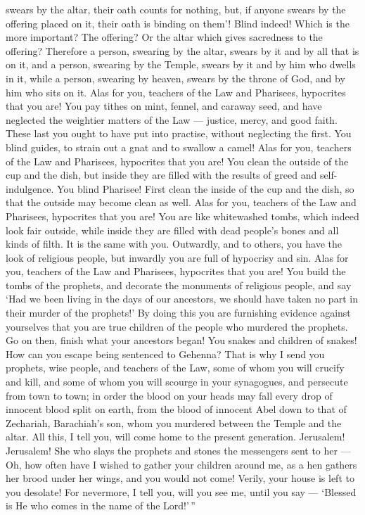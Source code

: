 swears by the altar, their oath counts for nothing, but, if anyone
swears by the offering placed on it, their oath is binding on them'!
 Blind indeed! Which is the more important? The offering?
Or the altar which gives sacredness to the offering? 
Therefore a person, swearing by the altar, swears by it and by all that
is on it,  and a person, swearing by the Temple, swears by
it and by him who dwells in it,  while a person, swearing
by heaven, swears by the throne of God, and by him who sits on it.
 Alas for you, teachers of the Law and Pharisees,
hypocrites that you are! You pay tithes on mint, fennel, and caraway
seed, and have neglected the weightier matters of the Law --- justice,
mercy, and good faith. These last you ought to have put into practise,
without neglecting the first.  You blind guides, to strain
out a gnat and to swallow a camel!  Alas for you, teachers
of the Law and Pharisees, hypocrites that you are! You clean the outside
of the cup and the dish, but inside they are filled with the results of
greed and self-indulgence.  You blind Pharisee! First clean
the inside of the cup and the dish, so that the outside may become clean
as well.  Alas for you, teachers of the Law and Pharisees,
hypocrites that you are! You are like whitewashed tombs, which indeed
look fair outside, while inside they are filled with dead people's bones
and all kinds of filth.  It is the same with you.
Outwardly, and to others, you have the look of religious people, but
inwardly you are full of hypocrisy and sin.  Alas for you,
teachers of the Law and Pharisees, hypocrites that you are! You build
the tombs of the prophets, and decorate the monuments of religious
people,  and say `Had we been living in the days of our
ancestors, we should have taken no part in their murder of the
prophets!'  By doing this you are furnishing evidence
against yourselves that you are true children of the people who murdered
the prophets.  Go on then, finish what your ancestors
began!  You snakes and children of snakes! How can you
escape being sentenced to Gehenna?  That is why I send you
prophets, wise people, and teachers of the Law, some of whom you will
crucify and kill, and some of whom you will scourge in your synagogues,
and persecute from town to town;  in order the blood on
your heads may fall every drop of innocent blood split on earth, from
the blood of innocent Abel down to that of Zechariah, Barachiah's son,
whom you murdered between the Temple and the altar.  All
this, I tell you, will come home to the present generation.
 Jerusalem! Jerusalem! She who slays the prophets and
stones the messengers sent to her --- Oh, how often have I wished to
gather your children around me, as a hen gathers her brood under her
wings, and you would not come!  Verily, your house is left
to you desolate!  For nevermore, I tell you, will you see
me, until you say --- `Blessed is He who comes in the name of the
Lord!'\,''


